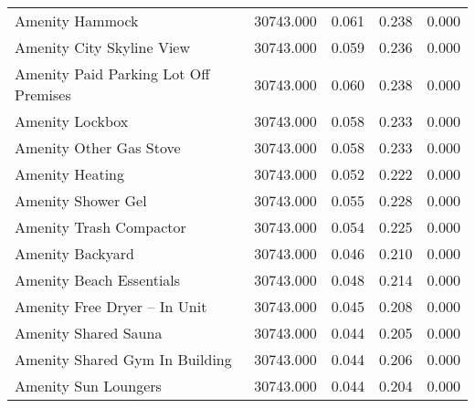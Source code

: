 \begin{tabular}{lllll}
Amenity Hammock & 30743.000 & 0.061 & 0.238 & 0.000 \\
Amenity City Skyline View & 30743.000 & 0.059 & 0.236 & 0.000 \\
Amenity Paid Parking Lot Off Premises & 30743.000 & 0.060 & 0.238 & 0.000 \\
Amenity Lockbox & 30743.000 & 0.058 & 0.233 & 0.000 \\
Amenity Other Gas Stove & 30743.000 & 0.058 & 0.233 & 0.000 \\
Amenity Heating & 30743.000 & 0.052 & 0.222 & 0.000 \\
Amenity Shower Gel & 30743.000 & 0.055 & 0.228 & 0.000 \\
Amenity Trash Compactor & 30743.000 & 0.054 & 0.225 & 0.000 \\
Amenity Backyard & 30743.000 & 0.046 & 0.210 & 0.000 \\
Amenity Beach Essentials & 30743.000 & 0.048 & 0.214 & 0.000 \\
Amenity Free Dryer – In Unit & 30743.000 & 0.045 & 0.208 & 0.000 \\
Amenity Shared Sauna & 30743.000 & 0.044 & 0.205 & 0.000 \\
Amenity Shared Gym In Building & 30743.000 & 0.044 & 0.206 & 0.000 \\
Amenity Sun Loungers & 30743.000 & 0.044 & 0.204 & 0.000 \\
\bottomrule
\end{tabular}
